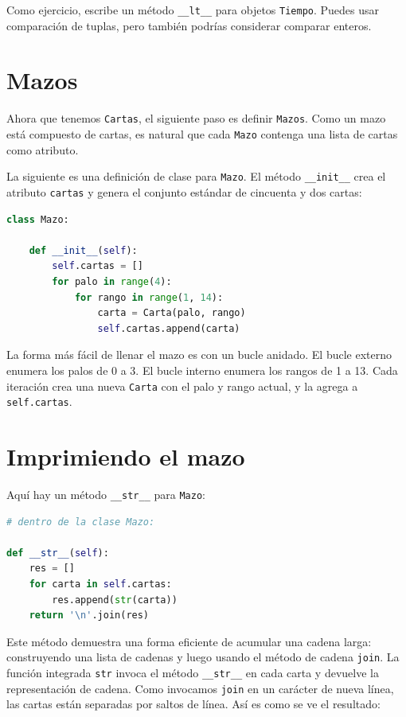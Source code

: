 Como ejercicio, escribe un método \texttt{\_\_lt\_\_} para objetos \texttt{Tiempo}. Puedes usar comparación de tuplas, pero también podrías considerar comparar enteros.

\section{Mazos}

Ahora que tenemos \texttt{Cartas}, el siguiente paso es definir \texttt{Mazos}. Como un mazo está compuesto de cartas, es natural que cada \texttt{Mazo} contenga una lista de cartas como atributo.

La siguiente es una definición de clase para \texttt{Mazo}. El método \texttt{\_\_init\_\_} crea el atributo \texttt{cartas} y genera el conjunto estándar de cincuenta y dos cartas:

\begin{lstlisting}[language=Python]
class Mazo:

    def __init__(self):
        self.cartas = []
        for palo in range(4):
            for rango in range(1, 14):
                carta = Carta(palo, rango)
                self.cartas.append(carta)
\end{lstlisting}

La forma más fácil de llenar el mazo es con un bucle anidado. El bucle externo enumera los palos de 0 a 3. El bucle interno enumera los rangos de 1 a 13. Cada iteración crea una nueva \texttt{Carta} con el palo y rango actual, y la agrega a \texttt{self.cartas}.

\section{Imprimiendo el mazo}

Aquí hay un método \texttt{\_\_str\_\_} para \texttt{Mazo}:

\begin{lstlisting}[language=Python]
# dentro de la clase Mazo:

def __str__(self):
    res = []
    for carta in self.cartas:
        res.append(str(carta))
    return '\n'.join(res)
\end{lstlisting}

Este método demuestra una forma eficiente de acumular una cadena larga: construyendo una lista de cadenas y luego usando el método de cadena \texttt{join}. La función integrada \texttt{str} invoca el método \texttt{\_\_str\_\_} en cada carta y devuelve la representación de cadena. Como invocamos \texttt{join} en un carácter de nueva línea, las cartas están separadas por saltos de línea. Así es como se ve el resultado:


